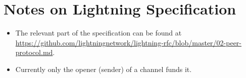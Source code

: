 \section{Notes on Lightning Specification}
\begin{itemize}
  \item The relevant part of the specification can be found at
  \url{https://github.com/lightningnetwork/lightning-rfc/blob/master/02-peer-protocol.md}.
  \item Currently only the opener (sender) of a channel funds it.
\end{itemize}
